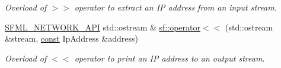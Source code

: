 \begin{DoxyCompactItemize}
\begin{DoxyCompactList}\small\item\em Overload of $>$$>$ operator to extract an I\-P address from an input stream. \end{DoxyCompactList}\item 
\hyperlink{sfml_2dep_2_s_f_m_l-2_84_82_2include_2_s_f_m_l_2_network_2_export_8hpp_ac5d46d4ffd98e947e28c54d051b338e7}{S\-F\-M\-L\-\_\-\-N\-E\-T\-W\-O\-R\-K\-\_\-\-A\-P\-I} std\-::ostream \& \hyperlink{namespacesf_ae2ba858510164a0143cd44efc843dcbe}{sf\-::operator$<$$<$} (std\-::ostream \&stream, \hyperlink{term__entry_8h_a57bd63ce7f9a353488880e3de6692d5a}{const} Ip\-Address \&address)
\begin{DoxyCompactList}\small\item\em Overload of $<$$<$ operator to print an I\-P address to an output stream. \end{DoxyCompactList}\end{DoxyCompactItemize}
